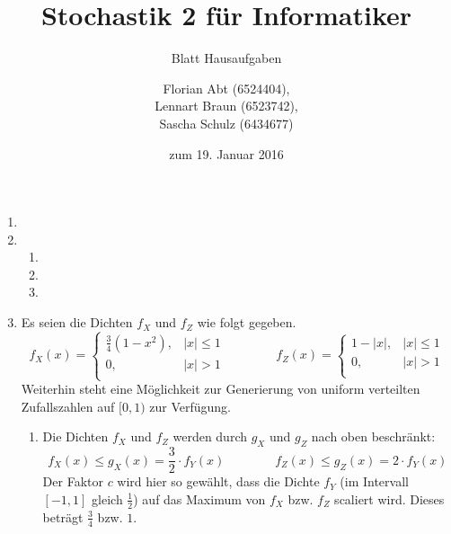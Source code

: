 \documentclass[a4paper]{scrartcl}
\title{Stochastik 2 für Informatiker}
\subtitle{Blatt {\blattnr} Hausaufgaben}
\author{
    Florian Abt (6524404), \\
    Lennart Braun (6523742), \\
    Sascha Schulz (6434677)
}
\date{zum 19. Januar 2016}
\def \blattnr {12}
\begin{document}
\maketitle

\begin{enumerate}[label=\bfseries \blattnr.\arabic*]
    \item %

    \item %
        \begin{enumerate}
            \item

            \item

            \item

        \end{enumerate}

    \item %
        Es seien die Dichten $f_X$ und $f_Z$ wie folgt gegeben.
        \begin{equation*}
            f_X(x) =
            \begin{cases}
                \frac{3}{4} (1-x^2), & |x| \leq 1 \\
                0,                   & |x| > 1    \\
            \end{cases}
            \qquad\qquad
            f_Z(x) =
            \begin{cases}
                1 - |x|, & |x| \leq 1 \\
                0,       & |x| > 1    \\
            \end{cases}
        \end{equation*}
        Weiterhin steht eine Möglichkeit zur Generierung von uniform verteilten
        Zufallszahlen auf $[0,1)$ zur Verfügung.
        \begin{enumerate}
            \item
                Die Dichten $f_X$ und $f_Z$ werden durch $g_X$ und $g_Z$ nach
                oben beschränkt:
                \begin{equation*}
                    f_X(x)
                    \leq g_X(x)
                    = \frac{3}{2} \cdot f_Y(x)
                    \qquad\qquad
                    f_Z(x)
                    \leq g_Z(x)
                    = 2 \cdot f_Y(x)
                \end{equation*}
                Der Faktor $c$ wird hier so gewählt, dass die Dichte $f_Y$ (im
                Intervall $[-1,1]$ gleich $\frac{1}{2}$) auf das Maximum von
                $f_X$ bzw. $f_Z$ scaliert wird. Dieses beträgt $\frac{3}{4}$
                bzw. $1$.


\end{enumerate}
\end{enumerate}
\end{document}
